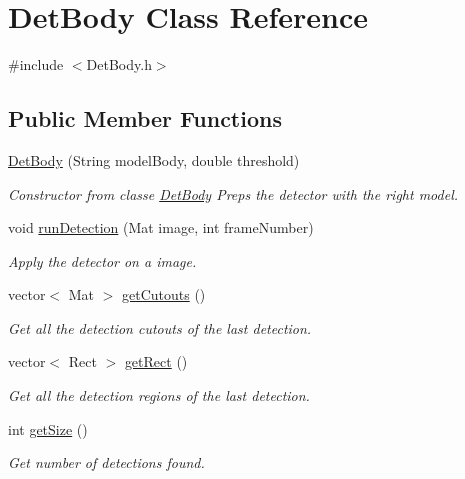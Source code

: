 \hypertarget{class_det_body}{\section{Det\-Body Class Reference}
\label{class_det_body}
}


{\ttfamily \#include $<$Det\-Body.\-h$>$}

\subsection*{Public Member Functions}
\begin{DoxyCompactItemize}
\item 
\hyperlink{class_det_body_ae1a67429278eb8e308c4556b290f9c86}{Det\-Body} (String model\-Body, double threshold)
\begin{DoxyCompactList}\small\item\em Constructor from classe \hyperlink{class_det_body}{Det\-Body} Preps the detector with the right model. \end{DoxyCompactList}\item 
void \hyperlink{class_det_body_a7ff893a2f420152562f384d470c2f584}{run\-Detection} (Mat image, int frame\-Number)
\begin{DoxyCompactList}\small\item\em Apply the detector on a image. \end{DoxyCompactList}\item 
vector$<$ Mat $>$ \hyperlink{class_det_body_a49950330c34cc30ab69046a84f3e4afe}{get\-Cutouts} ()
\begin{DoxyCompactList}\small\item\em Get all the detection cutouts of the last detection. \end{DoxyCompactList}\item 
vector$<$ Rect $>$ \hyperlink{class_det_body_adbaa5edcba2e9edde5a53bd2fa95b937}{get\-Rect} ()
\begin{DoxyCompactList}\small\item\em Get all the detection regions of the last detection. \end{DoxyCompactList}\item 
int \hyperlink{class_det_body_af1fff35cd01650d05dd002599b1ac57c}{get\-Size} ()
\begin{DoxyCompactList}\small\item\em Get number of detections found. \end{DoxyCompactList}\end{DoxyCompactItemize}


